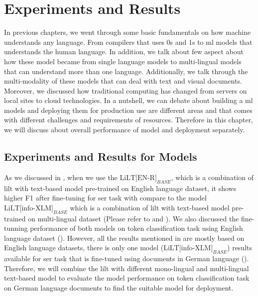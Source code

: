 \chapter{Experiments and Results}

In previous chapters, we went through some basic fundamentals on how machine understands any language. From compilers that uses 0s and 1s to \acrshort{ml} models that understands the human language. In addition, we talk about few aspect about how these model became from single language models to multi-lingual models that can understand more than one language. Additionally, we talk through the multi-modality of these models that can deal with text and visual documents. Moreover, we discussed how traditional computing has changed from servers on local sites to cloud technologies. In a nutshell, we can debate about building a \acrshort{ml} models and deploying them for production use are different areas and that comes with different challenges and requirements of resources. Therefore in this chapter, we will discuss about overall performance of model and deployment separately. 

\section{Experiments and Results for Models}

As we discussed in , when we use the \(\text{LiLT[EN-R]}_{BASE}\), which is a combination of \acrshort{lilt} with text-based model pre-trained on English language dataset, it shows higher F1 after fine-tuning for \acrfull{ser} task with compare to the model \(\text{LiLT[info-XLM]}_{BASE}\) which is a combination of \acrshort{lilt} with text-based model pre-trained on multi-lingual dataset (Please refer to  and ). We also discussed the fine-tunning performance of both models on token classification task using English language dataset (). However, all the results mentioned in  are mostly based on English language datasets, there is only one model (\(\text{LiLT[info-XLM]}_{BASE}\)) results available for \acrshort{ser} task that is fine-tuned using documents in German language (). Therefore, we will combine the \acrshort{lilt} with different mono-lingual and multi-lingual text-based model to evaluate the model performance on token classification task on German language documents to find the suitable model for deployment. 

